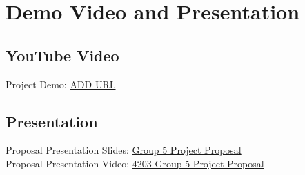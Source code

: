 \section{Demo Video and Presentation}

\subsection{YouTube Video}
Project Demo: {\color{blue}\href{<ADD URL>}{ADD URL}}

\subsection{Presentation}
Proposal Presentation Slides: {\color{blue}\href{https://docs.google.com/presentation/d/1XaMSUEic6h73LHT6Pn2JcByK-j4VYvJP/edit}{Group 5 Project Proposal}}\\
Proposal Presentation Video: {\color{blue}\href{https://youtu.be/NOwZpC8iaG8}{4203 Group 5 Project Proposal}}